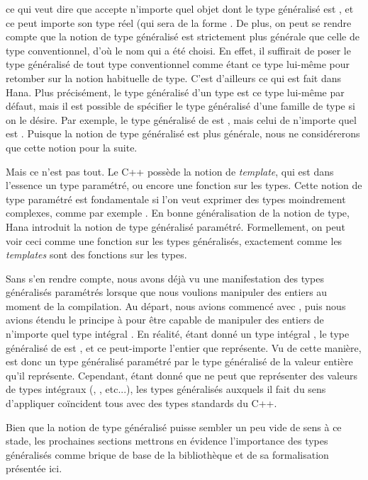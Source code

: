 ce qui veut dire que  accepte n'importe quel objet dont le
type généralisé est , et ce peut importe son type réel (qui sera
de la forme . De plus, on peut se rendre compte que la notion
de type généralisé est strictement plus générale que celle de type
conventionnel, d'où le nom qui a été choisi. En effet, il suffirait de poser
le type généralisé de tout type conventionnel comme étant ce type lui-même
pour retomber sur la notion habituelle de type. C'est d'ailleurs ce qui est
fait dans Hana. Plus précisément, le type généralisé d'un type est ce type
lui-même par défaut, mais il est possible de spécifier le type généralisé
d'une famille de type si on le désire. Par exemple, le type généralisé de
 est , mais celui de n'importe quel  est
. Puisque la notion de type généralisé est plus générale, nous ne
considérerons que cette notion pour la suite.

Mais ce n'est pas tout. Le C++ possède la notion de \textit{template}, qui
est dans l'essence un type paramétré, ou encore une fonction sur les types.
Cette notion de type paramétré est fondamentale si l'on veut exprimer des
types moindrement complexes, comme par exemple . En
bonne généralisation de la notion de type, Hana introduit la notion de
type généralisé paramétré. Formellement, on peut voir ceci comme une
fonction sur les types généralisés, exactement comme les \textit{templates}
sont des fonctions sur les types.

Sans s'en rendre compte, nous avons déjà vu une manifestation des types
généralisés paramétrés lorsque que nous voulions manipuler des entiers
au moment de la compilation. Au départ, nous avions commencé avec
, puis nous avions étendu le principe à
 pour être capable de manipuler des entiers
de n'importe quel type intégral . En réalité, étant donné un type
intégral , le type généralisé de 
est , et ce peut-importe l'entier  que
 représente. Vu de cette manière,
 est donc un type généralisé paramétré par
le type généralisé de la valeur entière qu'il représente. Cependant, étant
donné que  ne peut que représenter des valeurs de
types intégraux (, , etc...), les types généralisés
auxquels il fait du sens d'appliquer  coïncident
tous avec des types standards du C++.

Bien que la notion de type généralisé puisse sembler un peu vide de sens à
ce stade, les prochaines sections mettrons en évidence l'importance des types
généralisés comme brique de base de la bibliothèque et de sa formalisation
présentée ici.
